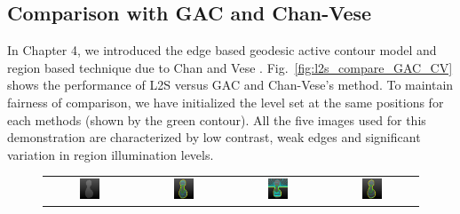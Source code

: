 \subsection{Comparison with GAC and Chan-Vese}
In Chapter 4, we introduced the edge based geodesic active contour\cite{caselles_geodesic} model and region based technique due to Chan and Vese \cite{chan_vese}. Fig.~\ref{fig:l2s_compare_GAC_CV} shows the performance of L2S versus GAC and Chan-Vese's method. To maintain fairness of comparison, we have initialized the level set at the same positions for each methods (shown by the green contour). All the five images used for this demonstration are characterized by low contrast, weak edges and significant variation in region illumination levels. 
\begin{figure}[t]
\centering
\renewcommand{\tabcolsep}{0.05cm}
\begin{tabular}{@{}cccc@{}}
\includegraphics[width=0.24\textwidth]{images/L2S_compare/orig_2}	&
\includegraphics[width=0.24\textwidth]{images/L2S_compare/GAC_2}	&
\includegraphics[width=0.24\textwidth]{images/L2S_compare/CV_2}		&
\includegraphics[width=0.24\textwidth]{images/L2S_compare/L2S_2}	

\end{tabular}
\end{figure}
